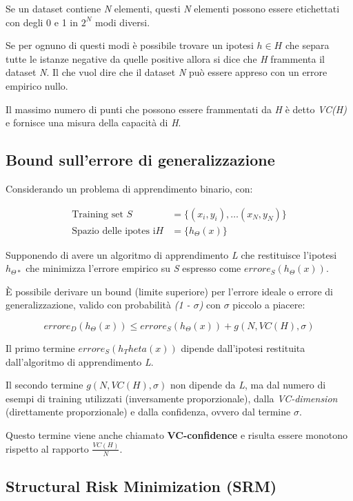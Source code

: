 Se un dataset contiene \emph{N} elementi, questi \emph{N} elementi
possono essere etichettati con degli 0 e 1 in $2^N$ modi diversi.

Se per ognuno di questi modi è possibile trovare un ipotesi $h \in H$
che separa tutte le istanze negative da quelle positive allora si dice
che \emph{H} frammenta il dataset \emph{N}. 
Il che vuol dire che il dataset \emph{N} può essere appreso con un errore empirico nullo.

Il massimo numero di punti che possono essere frammentati da \emph{H} è
detto \emph{VC(H)} e fornisce una misura della capacità di \emph{H}.

\subsection{Bound sull'errore di generalizzazione}\label{bound-sullerrore-di-generalizzazione}

Considerando un problema di apprendimento binario, con:

\begin{align*}
\text{Training set }S &= \{(x_i,y_i), \ldots (x_N, y_N)\} \\
\text{Spazio delle ipotes i} H &=\{h_\Theta(x)\} 
\end{align*}

Supponendo di avere un algoritmo di apprendimento \emph{L} che
restituisce l'ipotesi $h_{\Theta*}$ che minimizza l'errore empirico su
\emph{S} espresso come $errore_S(h_\Theta(x))$.

È possibile derivare un bound (limite superiore) per l'errore ideale o
errore di generalizzazione, valido con probabilità \emph{(1 - $\sigma$)} con
$\sigma$ piccolo a piacere:

$$
errore_D(h_\Theta(x)) \leq  errore_S(h_\Theta(x)) + g(N, VC(H), \sigma)
$$

Il primo termine $errore_S(h_Theta(x))$ dipende dall'ipotesi restituita
dall'algoritmo di apprendimento \textit{L}.

Il secondo termine $g(N, VC(H), \sigma)$ non dipende da \emph{L}, ma dal
numero di esempi di training utilizzati (inversamente proporzionale),
dalla \emph{VC-dimension} (direttamente proporzionale) e dalla
confidenza, ovvero dal termine $\sigma$.

Questo termine viene anche chiamato \textbf{VC-confidence} e risulta essere monotono rispetto al rapporto
$\frac{VC(H)}{N}$.

\subsection{Structural Risk Minimization (SRM)}\label{structural-risk-minimization-srm}

